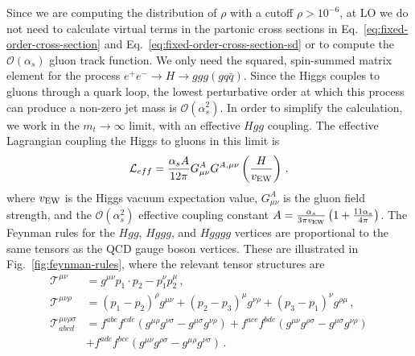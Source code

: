 \documentclass[letterpaper,11pt]{article}
\newcommand{\Fig}[1]{Fig.~\ref{#1}}
\newcommand{\Eq}[1]{Eq.~\eqref{#1}}
\begin{document}
Since we are computing the distribution of $\rho$ with a cutoff $\rho > 10^{-6}$, at LO we do not need to calculate virtual terms in the partonic cross sections in \Eq{eq:fixed-order-cross-section} and \Eq{eq:fixed-order-cross-section-sd} or to compute the $\mathcal{O}(\alpha_s)$ gluon track function. 
%
We only need the squared, spin-summed matrix element for the process $e^+e^-\rightarrow H \rightarrow ggg (gq\bar{q})$.
%
Since the Higgs couples to gluons through a quark loop, the lowest perturbative order at which this process can produce a non-zero jet mass is $\mathcal{O}(\alpha_s^2)$. 
%
In order to simplify the calculation, we work in the $m_t\rightarrow \infty$ limit, with an effective $Hgg$ coupling. 
%
The effective Lagrangian coupling the Higgs to gluons in this limit is~\cite{Inami:1982xt,Dawson:1990zj,Spira:1995rr}
\begin{equation}
\mathcal{L}_{eff} = \frac{\alpha_sA}{12\pi} G^{A}_{\mu \nu} G^{A,\mu \nu} \left( \frac{H}{v_{\rm EW}}\right)\,.
\end{equation}
where $v_{\rm EW}$ is the Higgs vacuum expectation value, $G^A_{\mu \nu}$ is the gluon field strength, and the $\mathcal{O}(\alpha_s^2)$ effective coupling constant $A=\frac{\alpha_s}{3\pi v_{\rm EW}}\left(1+\frac{11\alpha_s}{4\pi}\right)$.
%
The Feynman rules for the $Hgg$, $Hggg$, and $Hgggg$ vertices are proportional to the same tensors as the QCD gauge boson vertices. 
%
These are illustrated in \Fig{fig:feynman-rules}, where the relevant tensor structures are
\begin{align}
\mathcal{T}^{\mu \nu} &= g^{\mu \nu}p_1\cdot p_2 - p_1^\nu p_2^\mu \,,\\
\mathcal{T}^{\mu \nu \rho} &=  (p_1-p_2)^\rho g^{\mu \nu} + (p_2-p_3)^\mu g^{\nu\rho} + (p_3 - p_1)^\nu g^{\rho\mu}\,, \\ \nonumber
\mathcal{T}^{\mu \nu \rho\sigma}_{abcd} &= f^{abe}f^{cde}(g^{\mu \rho}g^{\nu\sigma} - g^{\mu \sigma}g^{\nu\rho}) + f^{ace}f^{bde}(g^{\mu \nu}g^{\rho\sigma} - g^{\mu \sigma}g^{\nu\rho})\\
& + f^{ade}f^{bce}(g^{\mu \nu}g^{\rho\sigma} - g^{\mu \rho}g^{\nu\sigma})\,.
\end{align}
\end{document}
